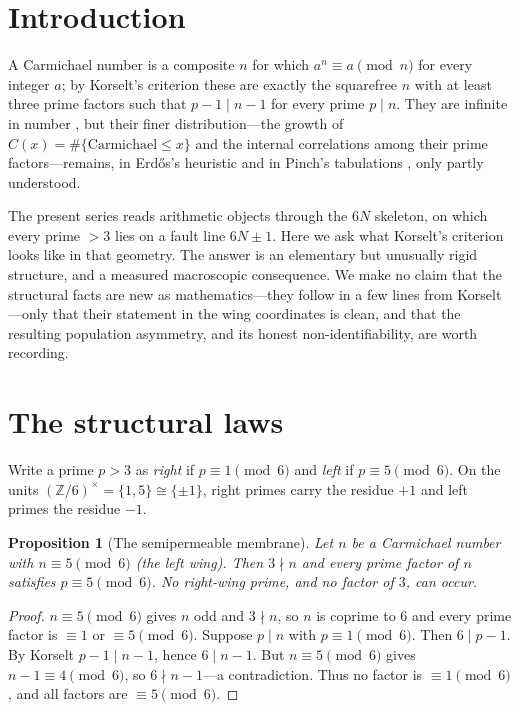 \documentclass[11pt]{article}
\theoremstyle{plain}
\newtheorem{proposition}{Proposition}
\theoremstyle{definition}
\begin{document}
\section{Introduction}
A Carmichael number is a composite $n$ for which $a^{n}\equiv a\pmod n$ for every integer $a$; by
Korselt's criterion \cite{Korselt} these are exactly the squarefree $n$ with at least three prime
factors such that $p-1\mid n-1$ for every prime $p\mid n$. They are infinite in number
\cite{AGP}, but their finer distribution---the growth of $C(x)=\#\{\text{Carmichael}\le x\}$ and the
internal correlations among their prime factors---remains, in Erd\H{o}s's heuristic \cite{Erdos} and
in Pinch's tabulations \cite{Pinch}, only partly understood.

The present series reads arithmetic objects through the $6N$ skeleton, on which every prime $>3$ lies
on a fault line $6N\pm1$. Here we ask what Korselt's criterion looks like in that geometry. The answer
is an elementary but unusually rigid structure, and a measured macroscopic consequence. We make no
claim that the structural facts are new as mathematics---they follow in a few lines from Korselt---only
that their statement in the wing coordinates is clean, and that the resulting population asymmetry, and
its honest non-identifiability, are worth recording.

\section{The structural laws}
Write a prime $p>3$ as \emph{right} if $p\equiv1\pmod6$ and \emph{left} if $p\equiv5\pmod6$. On the
units $(\mathbb Z/6)^{\times}=\{1,5\}\cong\{\pm1\}$, right primes carry the residue $+1$ and left
primes the residue $-1$.

\begin{proposition}[The semipermeable membrane]\label{prop:membrane}
Let $n$ be a Carmichael number with $n\equiv5\pmod6$ (the left wing). Then $3\nmid n$ and every prime
factor of $n$ satisfies $p\equiv5\pmod6$. No right-wing prime, and no factor of $3$, can occur.
\end{proposition}

\begin{proof}
$n\equiv5\pmod6$ gives $n$ odd and $3\nmid n$, so $n$ is coprime to $6$ and every prime factor is
$\equiv1$ or $\equiv5\pmod6$. Suppose $p\mid n$ with $p\equiv1\pmod6$. Then $6\mid p-1$. By Korselt
$p-1\mid n-1$, hence $6\mid n-1$. But $n\equiv5\pmod6$ gives $n-1\equiv4\pmod6$, so $6\nmid n-1$---a
contradiction. Thus no factor is $\equiv1\pmod6$, and all factors are $\equiv5\pmod6$.
\end{proof}
\end{document}
